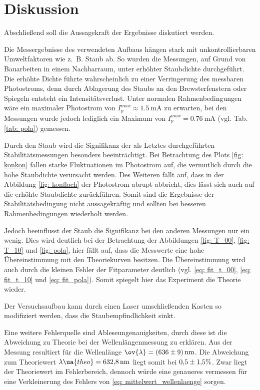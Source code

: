 \section{Diskussion}
Abschließend soll die Aussagekraft der Ergebnisse diskutiert werden.

Die Messergebnisse des verwendeten Aufbaus hängen stark mit
unkontrollierbaren Umweltfaktoren wie z.\, B. Staub ab. %
So wurden die Messungen, auf Grund von Bauarbeiten in einem Nachbarraum, %
unter erhöhter Staubdichte durchgeführt. Die erhöhte Dichte führte wahrscheinlich zu einer Verringerung des
messbaren Photostroms, denn durch Ablagerung des Staubs an den Brewsterfenstern oder Spiegeln entsteht ein
Intensitätsverlust. Unter normalen Rahmenbedingungen wäre ein
maximaler Photostrom von $I_{p}^{max}\approx\SI{1.5}{\milli\ampere}$ zu erwarten,
bei den Messungen wurde jedoch lediglich ein Maximum von $I_{p}^{max}=\SI{0.76}{\milli\ampere}$ %
(vgl. Tab. \ref{tab: pola}) gemessen.

Durch den Staub wird die Signifikanz der als Letztes durchgeführten Stabilitätsmessungen besonders beeinträchtigt.
Bei Betrachtung des Plots \ref{fig: konkon} fallen starke Fluktuationen im Photostrom auf,
die vermutlich durch die hohe Staubdichte verursacht werden. Des Weiteren fällt auf, dass
in der Abbildung \ref{fig: konflach} der Photostrom abrupt abbricht, dies lässt sich
auch auf die erhöhte Staubdichte zurückführen. Somit sind die Ergebnisse der Stabilitätsbedingung nicht aussagekräftig und sollten
bei besseren Rahmenbedingungen wiederholt werden.

Jedoch beeinflusst der Staub die Signifikanz bei den anderen Messungen nur ein wenig.
Dies wird deutlich bei der Betrachtung der Abbildungen \ref{fig: T_00}, \ref{fig: T_10} und \ref{fig: pola},
hier fällt auf, dass die Messwerte eine hohe Übereinstimmung mit den Theoriekurven besitzen.
Die Übereinstimmung wird auch durch die kleinen Fehler der Fitparameter deutlich
(vgl. \eqref{eq: fit_t_00}, \eqref{eq: fit_t_10} und \eqref{eq: fit_pola}).
Somit spiegelt hier das Experiment die Theorie wieder.

Der Versuchsaufbau kann durch einen Laser umschließenden Kasten so modifiziert werden,
dass die Staubempfindlichkeit sinkt.

Eine weitere Fehlerquelle sind Ableseungenauigkeiten,
durch diese ist die Abweichung zu Theorie bei der Wellenlängenmessung zu erklären.
Aus der Messung resultiert für die Wellenlänge $\ov{\lambda}=\SI{636\pm9}{\nano\meter}$.
Die Abweichung zum Theoriewert $\lambda\ua{theo}=\SI{632.8}{\nano\meter}$ \cite{anleitung61}
liegt somit bei $\num{0.5\pm 1.5} \%$. Zwar liegt der Theoriewert im Fehlerbereich, dennoch
würde eine genaueres vermessen für eine Verkleinerung des Fehlers von \eqref{eq: mittelwert_wellenlaenge} sorgen.

